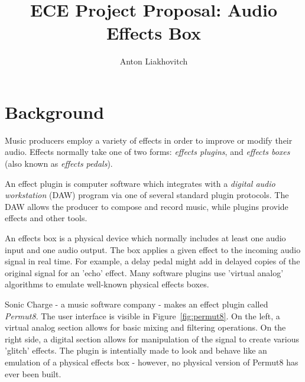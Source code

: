 \documentclass[12pt, letterpaper]{article}
\title{ECE Project Proposal: Audio Effects Box}
\author{Anton Liakhovitch}
\begin{document}
\maketitle
\section{Background}
\par
Music producers employ a variety of effects in order to improve or modify their audio. Effects normally take one of two forms: \textit{effects plugins}, and \textit{effects boxes} (also known as \textit{effects pedals}).
\par
An effect plugin is computer software which integrates with a \textit{digital audio workstation} (DAW) program via one of several standard plugin protocols. The DAW allows the producer to compose and record music, while plugins provide effects and other tools.
\par
An effects box is a physical device which normally includes at least one audio input and one audio output. The box applies a given effect to the incoming audio signal in real time. For example, a delay pedal might add in delayed copies of the original signal for an 'echo' effect. Many software plugins use 'virtual analog' algorithms to emulate well-known physical effects boxes.
\par
Sonic Charge - a music software company - makes an effect plugin called \textit{Permut8}. The user interface is visible in Figure~\ref{fig:permut8}. On the left, a virtual analog section allows for basic mixing and filtering operations. On the right side, a digital section allows for manipulation of the signal to create various 'glitch' effects. The plugin is intentially made to look and behave like an emulation of a physical effects box - however, no physical version of Permut8 has ever been built.
\end{document}
